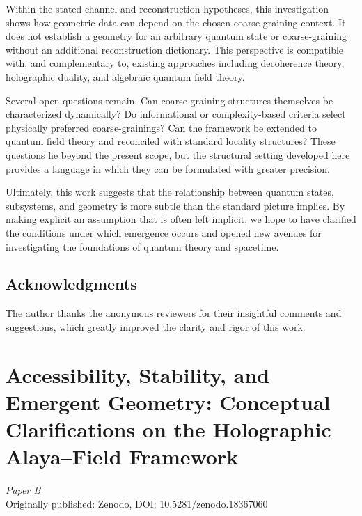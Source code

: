 \documentclass[12pt,a4paper,openany]{book}
\begin{document}
Within the stated channel and reconstruction hypotheses, this investigation shows how geometric data can depend on the chosen coarse-graining context. 
It does not establish a geometry for an arbitrary quantum state or coarse-graining without an additional reconstruction dictionary. 
This perspective is compatible with, and complementary to, existing approaches including decoherence theory, holographic duality, and algebraic quantum field theory.

Several open questions remain. 
Can coarse-graining structures themselves be characterized dynamically? 
Do informational or complexity-based criteria select physically preferred coarse-grainings? 
Can the framework be extended to quantum field theory and reconciled with standard locality structures? 
These questions lie beyond the present scope, but the structural setting developed here provides a language in which they can be formulated with greater precision.

Ultimately, this work suggests that the relationship between quantum states, subsystems, and geometry is more subtle than the standard picture implies. 
By making explicit an assumption that is often left implicit, we hope to have clarified the conditions under which emergence occurs and opened new avenues for investigating the foundations of quantum theory and spacetime.

\section*{Acknowledgments}

The author thanks the anonymous reviewers for their insightful comments and suggestions, which greatly improved the clarity and rigor of this work.

\chapter{Accessibility, Stability, and Emergent Geometry: Conceptual Clarifications on the Holographic Alaya--Field Framework}
\label{H-chap:paperB}

\begin{center}
\textit{Paper B}\\[0.5em]
Originally published: Zenodo, DOI: 10.5281/zenodo.18367060
\end{center}
\end{document}
